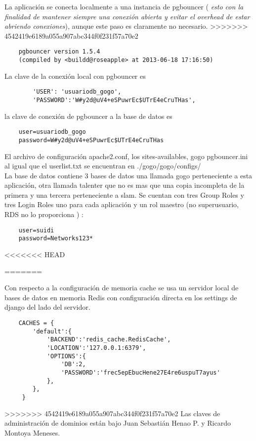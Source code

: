 \documentclass[10pt,a4paper]{book}
\begin{document}
	La aplicación se conecta localmente a una instancia de pgbouncer ( \textit{esto con la finalidad de mantener siempre una conexión abierta y evitar el overhead de estar abriendo conexiones}), aunque este paso es claramente no necesario.
>>>>>>> 4542419e6189a055a907abc344f0f231f57a70e2
	\begin{verbatim}
	pgbouncer version 1.5.4
	(compiled by <buildd@roseapple> at 2013-06-18 17:16:50)
	\end{verbatim}

	La clave de la conexión local con pgbouncer es
	\begin{verbatim}
		'USER': 'usuariodb_gogo',
		'PASSWORD':'W#y2d@uV4+eSPuwrEc$UTrE4eCruTHas',
	\end{verbatim}

	la clave de conexión de pgbouncer a la base de datos es
	\begin{verbatim}
	user=usuariodb_gogo
	password=W#y2d@uV4+eSPuwrEc$UTrE4eCruTHas
	\end{verbatim}

	El archivo de configuración apache2.conf, los sites-availables, gogo pgbouncer.ini al igual que el userlist.txt se encuentran en ./gogo/gogo/configs/ \\

	La base de datos contiene 3 bases de datos una llamada gogo perteneciente a esta aplicación, otra llamada talenter que no es mas que una copia incompleta de la primera y una tercera perteneciente a slam. Se cuentan con tres Group Roles y tres Login Roles uno para cada aplicación y un rol maestro (no superusuario, RDS no lo proporciona ) :
	\begin{verbatim}
	user=suidi
	password=Networks123*
	\end{verbatim}
<<<<<<< HEAD

=======
	
	Con respecto a la configuración de memoria cache se usa un servidor local de bases de datos en memoria Redis con configuración directa en los settings de django del lado del servidor.
	
	\begin{verbatim}
	CACHES = {
	  	'default':{
	  		'BACKEND':'redis_cache.RedisCache',
	  		'LOCATION':'127.0.0.1:6379',
	  		'OPTIONS':{
	  			'DB':2,
	  			'PASSWORD':'frec5epEbucHene27E4re6uspuT7ayus'
	  		},
	  	},
	 }
	\end{verbatim}
	
	
>>>>>>> 4542419e6189a055a907abc344f0f231f57a70e2
	Las claves de administración de dominios están bajo Juan Sebastián Henao P. y Ricardo Montoya Meneses.
\end{document}
